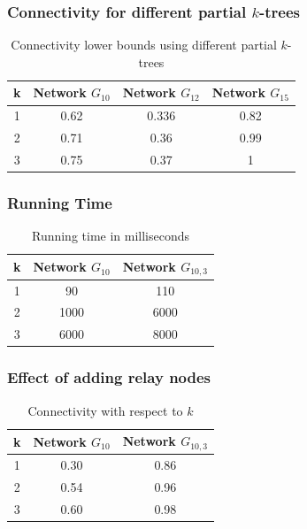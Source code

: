 \documentclass{beamer}
\begin{document}
\begin{frame}
\frametitle{Connectivity for different partial $k$-trees}
\begin{table}[!htb] 
      \centering
     \begin{tabular}{|c|c|c|c|}
     \hline
      k& Network $G_{10}$ & Network $G_{12}$ & Network $G_{15}$ \\
     \hline
      1 & 0.62&0.336& 0.82 \\\hline
2 &0.71 & 0.36& 0.99\\\hline
3 &0.75& 0.37& 1\\\hline
\end{tabular}
 \caption{Connectivity lower bounds using different partial $k$-trees}
 \label{Tab:acc}
\end{table}
\end{frame}


\begin{frame}
\frametitle{Running Time}
\begin{table}[!htb]
    \begin{minipage}{1\linewidth}
   
      \centering
     \begin{tabular}{|c|c|c|}
     \hline
         k& Network $G_{10}$ &Network $G_{10,3}$\\
     \hline
     1&90& 110 \\\hline
     2&1000 &6000	\\\hline
3 &6000&8000	 \\\hline
\end{tabular}
 \caption{Running time in milliseconds}
\label{Tab:rtym1}
    \end{minipage}
\end{table}

\end{frame}

\begin{frame}
\frametitle{Effect of adding relay nodes}

\begin{table}[!htb]
  \centering
 \begin{minipage}{.5\linewidth}
     \begin{tabular}{|c|c|c|}
     \hline
     k & Network $G_{10}$ & Network $G_{10,3}$  \\
     \hline
      1 & 0.30 & 0.86 \\\hline
	  2 & 0.54 & 0.96\\\hline
	  3 &0.60 & 0.98 \\\hline
\end{tabular}
    \end{minipage}
     \caption{Connectivity with respect to $k$}
      \label{Tab:SRC}   
\end{table}
\end{frame}
\end{document}
